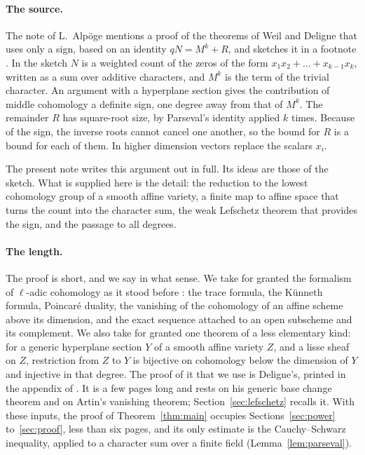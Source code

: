 \documentclass[11pt,a4paper]{article}
\theoremstyle{plain}
\theoremstyle{remark}
\begin{document}
\paragraph{The source.}
The note \cite{Alpoge} of L.~Alp\"oge mentions a proof of the theorems of Weil and Deligne that uses only a sign,
based on an identity $qN=M^k+R$, and sketches it in a footnote \cite[p.~2 and footnote 3]{Alpoge}. In the sketch $N$
is a weighted count of the zeros of the form $x_1x_2+\dots+x_{k-1}x_k$, written as a sum over additive characters, and
$M^k$ is the term of the trivial character. An argument with a hyperplane section gives the contribution of middle
cohomology a definite sign, one degree away from that of $M^k$. The remainder $R$ has square-root size, by Parseval's
identity applied $k$ times. Because of the sign, the inverse roots cannot cancel one another, so the bound for $R$ is
a bound for each of them. In higher dimension vectors replace the scalars $x_i$.

The present note writes this argument out in full. Its ideas are those of the sketch. What is supplied here is the
detail: the reduction to the lowest cohomology group of a smooth affine variety, a finite map to affine space that
turns the count into the character sum, the weak Lefschetz theorem that provides the sign, and the passage to all
degrees.

\paragraph{The length.}
The proof is short, and we say in what sense. We take for granted the formalism of $\ell$-adic cohomology as it stood
before \cite{WeilI}: the trace formula, the K\"unneth formula, Poincar\'e duality, the vanishing of the cohomology of
an affine scheme above its dimension, and the exact sequence attached to an open subscheme and its complement. We
also take for granted one theorem of a less elementary kind: for a generic hyperplane section $Y$ of a smooth
affine variety $Z$, and a lisse sheaf on $Z$, restriction from $Z$ to $Y$ is bijective on cohomology below the
dimension of $Y$ and injective in that degree. The proof of it that we use is Deligne's, printed in the appendix of \cite{KatzACT}. It is a few pages long
and rests on his generic base change theorem and on Artin's vanishing theorem; Section~\ref{sec:lefschetz} recalls
it. With these inputs, the proof of Theorem~\ref{thm:main} occupies Sections~\ref{sec:power} to~\ref{sec:proof},
less than six pages, and its only estimate is the Cauchy--Schwarz inequality, applied to a character sum over a
finite field (Lemma~\ref{lem:parseval}).
\end{document}
